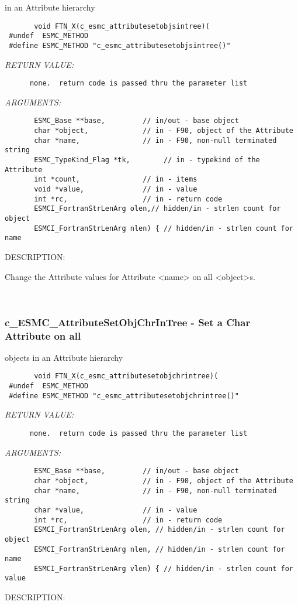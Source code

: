                                                  in an Attribute hierarchy
  
\begin{verbatim}       void FTN_X(c_esmc_attributesetobjsintree)(
 #undef  ESMC_METHOD
 #define ESMC_METHOD "c_esmc_attributesetobjsintree()"\end{verbatim}{\em RETURN VALUE:}
\begin{verbatim}      none.  return code is passed thru the parameter list
   \end{verbatim}{\em ARGUMENTS:}
\begin{verbatim}       ESMC_Base **base,         // in/out - base object
       char *object,             // in - F90, object of the Attribute
       char *name,               // in - F90, non-null terminated string
       ESMC_TypeKind_Flag *tk,        // in - typekind of the Attribute
       int *count,               // in - items
       void *value,              // in - value
       int *rc,                  // in - return code
       ESMCI_FortranStrLenArg olen,// hidden/in - strlen count for object
       ESMCI_FortranStrLenArg nlen) { // hidden/in - strlen count for name
   \end{verbatim}
{\sf DESCRIPTION:\\ }


       Change the Attribute values for Attribute <name> on all <object>s.
   
 
\mbox{}\hrulefill\ 
 
\subsubsection [c\_ESMC\_AttributeSetObjChrInTree] {c\_ESMC\_AttributeSetObjChrInTree - Set a Char Attribute on all}


                                             objects in an Attribute hierarchy
  
\begin{verbatim}       void FTN_X(c_esmc_attributesetobjchrintree)(
 #undef  ESMC_METHOD
 #define ESMC_METHOD "c_esmc_attributesetobjchrintree()"\end{verbatim}{\em RETURN VALUE:}
\begin{verbatim}      none.  return code is passed thru the parameter list
   \end{verbatim}{\em ARGUMENTS:}
\begin{verbatim}       ESMC_Base **base,         // in/out - base object
       char *object,             // in - F90, object of the Attribute
       char *name,               // in - F90, non-null terminated string
       char *value,              // in - value
       int *rc,                  // in - return code
       ESMCI_FortranStrLenArg olen, // hidden/in - strlen count for object
       ESMCI_FortranStrLenArg nlen, // hidden/in - strlen count for name
       ESMCI_FortranStrLenArg vlen) { // hidden/in - strlen count for value
   \end{verbatim}
{\sf DESCRIPTION:\\ }


